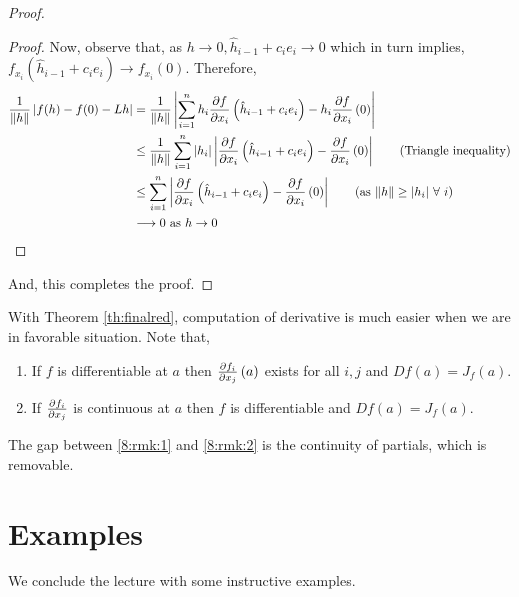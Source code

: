 \documentclass[../Analysis-3.tex]{subfiles}
\begin{document}
\begin{proof}
\begin{proof}
    Now, observe that, as $ h \to 0, \hat{h}_{i-1}+c_ie_i \to 0 $ which in turn implies, $ f_{x_i}( \hat{h}_{i-1}+c_ie_i ) \to f_{x_i}(0) $. Therefore,
    \begin{align*}
      \frac{1}{\norm{h}}\left| f(h)-f(0)-Lh \right|
       & = \frac{1}{\norm{h}}\left| \sum_{i=1}^{n} h_i\pdv{f}{x_i}\left( \hat{h}_{i-1} + c_ie_i \right) - h_i\pdv{f}{x_i}\left( 0 \right) \right|                                          \\
       & \leq \frac{1}{\norm{h}}\sum_{i=1}^{n} \left| h_i \right|\left| \pdv{f}{x_i}\left( \hat{h}_{i-1} + c_ie_i \right) - \pdv{f}{x_i}\left( 0 \right) \right| \tag{Triangle inequality} \\
       & \leq \sum_{i=1}^{n} \left| \pdv{f}{x_i}\left( \hat{h}_{i-1} + c_ie_i \right) - \pdv{f}{x_i}\left( 0 \right) \right|  \tag{as $\norm{h} \geq |h_i|\ \forall\ i$}                   \\
       & \longrightarrow 0 \text{ as } h \to 0
    \end{align*}
  \end{proof}
  And, this completes the proof.
\end{proof}

With Theorem \ref{th:finalred}, computation of derivative is much easier when we are in favorable situation. Note that,
\begin{enumerate}[label = (\roman*)]
  \item If $ f $ is differentiable at $ a $ then $ \pdv{f_i}{x_j}\left( a \right) $ exists for all $ i, j $ and $ Df(a) = J_{f}(a) $. \label{8:rmk:1}
  \item If $ \pdv{f_i}{x_j} $ is continuous at $ a $ then $ f $ is differentiable and $ Df(a) = J_{f}(a) $. \label{8:rmk:2}
\end{enumerate}
The gap between \ref{8:rmk:1} and \ref{8:rmk:2} is the continuity of partials, which is removable.


\section{Examples}
We conclude the lecture with some instructive examples.
\end{document}
